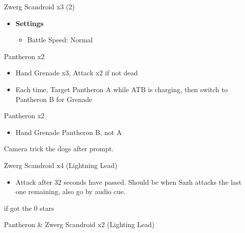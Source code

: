 \begin{paracol}{2}
	\begin{battle}{Zwerg Scandroid x3 (2)}
	\end{battle}
	\switchcolumn
	\begin{menu}
		\begin{itemize}
			\item \textbf{Settings}
			      \begin{itemize}
				      \item Battle Speed: Normal
			      \end{itemize}
		\end{itemize}
	\end{menu}
	\switchcolumn
	\switchcolumn*
	\begin{battle}{Pantheron x2}
		\begin{itemize}
			\item Hand Grenade x3, Attack x2 if not dead
			\item Each time, Target Pantheron A while ATB is charging, then switch to Pantheron B for Grenade
		\end{itemize}
	\end{battle}
	\switchcolumn
	\begin{battle}{Pantheron x2}
		\begin{itemize}
			\item Hand Grenade Pantheron B, not A
		\end{itemize}
	\end{battle}

	\switchcolumn*

	Camera trick the dogs after prompt.

	\begin{battle}{Zwerg Scandroid x4 (Lightning Lead)}
		\begin{itemize}
			\item Attack after 32 seconds have passed. Should be when Sazh attacks the last one remaining, also go by audio cue.
		\end{itemize}
		 if got the 0 stars
	\end{battle}


	\begin{battle}{Pantheron \& Zwerg Scandroid x2 (Lighting Lead)}
	\end{battle}



\end{paracol}
